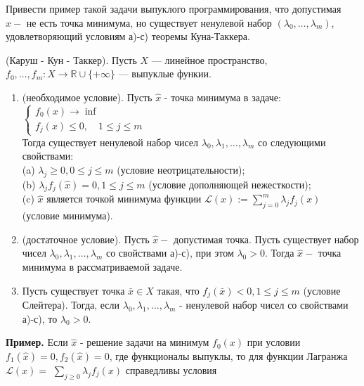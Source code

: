 \begin{task}
Привести пример такой задачи выпуклого программирования, что допустимая $\hat{x}-$ не есть точка минимума, но существует ненулевой набор $\left(\lambda_{0}, \ldots, \lambda_{m}\right)$, удовлетворяющий условиям а)-с) теоремы Куна-Таккера.

\begin{theorem}
    (Каруш - Кун - Таккер). Пусть $X$ --- линейное пространство, $f_0, \ldots, f_m: X \rightarrow \mathbb{R} \cup\{+\infty\}$ --- выпуклые функии.
    \begin{enumerate}
        \item (необходимое условие). Пусть $\hat{x}$ - точка минимума в задаче: 
                \\
                $\left\{\begin{array}{l}f_0(x) \rightarrow \inf \\ f_j(x) \leq 0, \quad 1 \leq j \leq m\end{array}\right.$
                \\

        Тогда существует ненулевой набор чисел $\lambda_0, \lambda_1, \ldots, \lambda_m$ со следующими свойствами: \\
            (a) $\lambda_j \geq 0,0 \leq j \leq m$ (условие неотрицательности); \\
            (b) $\lambda_j f_j(\hat{x})=0, 1 \leq j \leq m$ (условие дополняющей нежесткости); \\
            (c) $\hat{x}$ является точкой минимума функции $\mathcal{L}(x):=\sum_{j=0}^m \lambda_j f_j(x)$ (условие минимума). \\
        \item (достаточное условие). Пусть $\hat{x}-$ допустимая точка. Пусть существует набор чисел $\lambda_0, \lambda_1, \ldots, \lambda_m$ 
            со свойствами а)-с), при этом $\lambda_0>0$. Тогда $\hat{x}-$ точка минимума в рассматриваемой задаче.
        \item Пусть существует точка $\bar{x} \in X$ такая, что $f_j(\bar{x})<0,1 \leq j \leq m$ (условие Слейтера). 
        Тогда, если $\lambda_0, \lambda_1, \ldots, \lambda_m$ - ненулевой набор чисел со свойствами а)-с), то $\lambda_0>0$.
    \end{enumerate}
\end{theorem}

\textbf{Пример.}
Если $\hat{x}$ - решение задачи на минимум $f_{0}(x)$ при условии $f_{1}(\hat{x})=0, f_{2}(\hat{x})=0$, где функционалы выпуклы, то для функции Лагранжа $\mathcal{L}(x)=$ $\sum_{j \geq 0} \lambda_{j} f_{j}(x)$ справедливы условия


\end{task}
